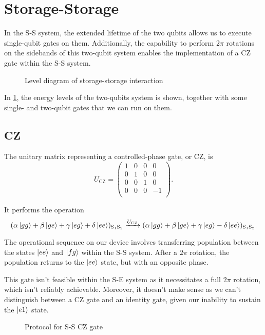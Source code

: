 
\section{Storage-Storage}
\label{sec:S-S}

In the S-S system, the extended lifetime of the two qubits allows us to execute single-qubit gates on them.
Additionally, the capability to perform $2\pi$ rotations on the sidebands of this two-qubit system enables the implementation of a CZ gate within the S-S system.

\begin{figure}
    \centering
    
    \vspace{-1cm}
    \caption{Level diagram of storage-storage interaction}
    \label{fig:SS_level}
\end{figure}

In \cref{fig:SS_level}, the energy levels of the two-qubits system is shown, together with some single- and two-qubit gates that we can run on them.

\subsection{CZ}

The unitary matrix representing a controlled-phase gate, or CZ, is
\begin{equation}
    U_{\text{CZ}} = 
    \begin{pmatrix}
    1 & 0 & 0 & 0 \\
    0 & 1 & 0 & 0 \\
    0 & 0 & 1 & 0 \\
    0 & 0 & 0 & -1 \\
\end{pmatrix}.
\end{equation}

It performs the operation
\begin{equation}
    (\alpha \ket{gg} + \beta \ket{ge} + \gamma \ket{eg} + \delta \ket{ee})_{\text{S}_1 \text{S}_2} \xrightarrow{U_{\text{CZ}}}
    (\alpha \ket{gg} + \beta \ket{ge} + \gamma \ket{eg} - \delta \ket{ee})_{\text{S}_1 \text{S}_2} . 
\end{equation}

The operational sequence on our device involves transferring population between the states $\ket{ee}$ and $\ket{fg}$ within the S-S system.
After a $2\pi$ rotation, the population returns to the $\ket{ee}$ state, but with an opposite phase.

This gate isn't feasible within the S-E system as it necessitates a full $2\pi$ rotation, which isn't reliably achievable.
Moreover, it doesn't make sense as we can't distinguish between a CZ gate and an identity gate, given our inability to sustain the $\ket{e1}$ state.

\begin{figure}
    \centering
    
    \vspace{-1cm}
    \caption{Protocol for S-S CZ gate}
    \label{fig:SS_CZ}
\end{figure}